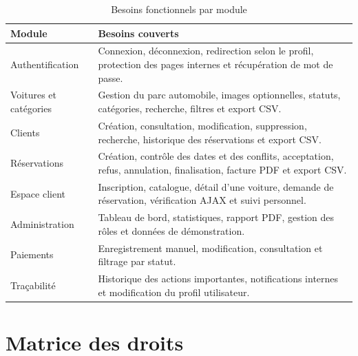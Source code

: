 \begin{longtable}{|p{3.4cm}|p{10.8cm}|}
\caption{Besoins fonctionnels par module}\\
\hline
\textbf{Module} & \textbf{Besoins couverts} \\
\hline
Authentification & Connexion, déconnexion, redirection selon le profil, protection des pages internes et récupération de mot de passe. \\
\hline
Voitures et catégories & Gestion du parc automobile, images optionnelles, statuts, catégories, recherche, filtres et export CSV. \\
\hline
Clients & Création, consultation, modification, suppression, recherche, historique des réservations et export CSV. \\
\hline
Réservations & Création, contrôle des dates et des conflits, acceptation, refus, annulation, finalisation, facture PDF et export CSV. \\
\hline
Espace client & Inscription, catalogue, détail d'une voiture, demande de réservation, vérification AJAX et suivi personnel. \\
\hline
Administration & Tableau de bord, statistiques, rapport PDF, gestion des rôles et données de démonstration. \\
\hline
Paiements & Enregistrement manuel, modification, consultation et filtrage par statut. \\
\hline
Traçabilité & Historique des actions importantes, notifications internes et modification du profil utilisateur. \\
\hline
\end{longtable}

\section{Matrice des droits}

